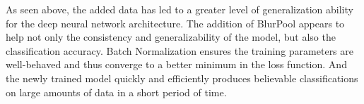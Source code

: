 As seen above, the added data has led to a greater level of generalization ability for the deep neural network architecture.
The addition of BlurPool appears to help not only the consistency and generalizability of the model, but also the classification accuracy.
Batch Normalization ensures the training parameters are well-behaved and thus converge to a better minimum in the loss function.
And the newly trained model quickly and efficiently produces believable classifications on large amounts of data in a short period of time.


